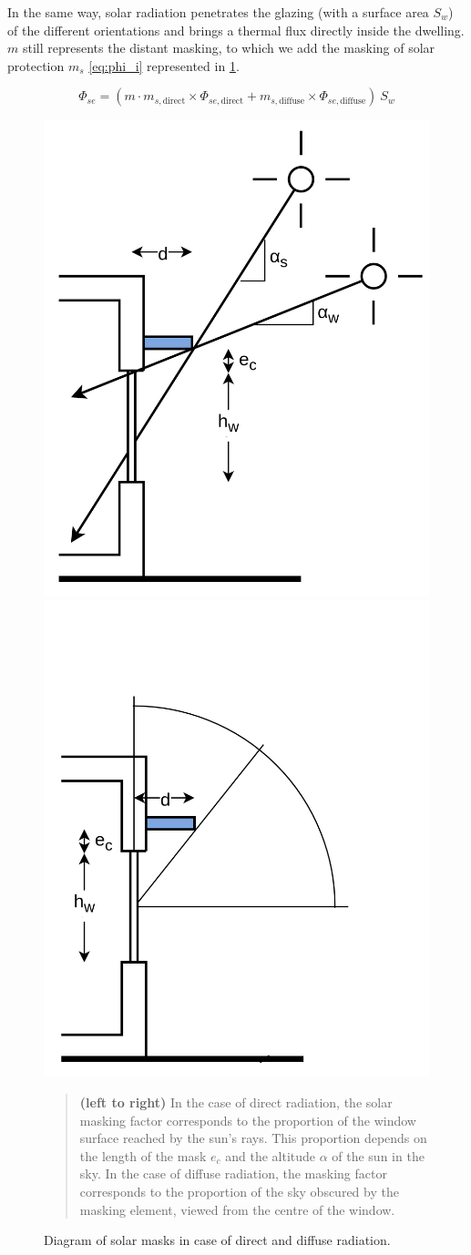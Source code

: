 \documentclass[11pt]{article}
\begin{document}
                In the same way, solar radiation penetrates the glazing (with a surface area $S_w$) of the different orientations and brings a thermal flux directly inside the dwelling. $m$ still represents the distant masking, to which we add the masking of solar protection $m_s$ \eqref{eq:phi_i} represented in \ref{fig:solar_mask_diagram}. 

                \begin{equation}\label{eq:phi_i}
                    \Phi_{se} = \left(m\cdot m_{s,\mathrm{direct}}\times \Phi_{se,\mathrm{direct}} + m_{s,\mathrm{diffuse}}\times\Phi_{se,\mathrm{diffuse}}\right)~ S_w
                \end{equation}

                \begin{figure}[ht]
                \centering
                
                \includegraphics[width=0.32\columnwidth]{figures/solar_mask_direct.png}\hspace{1cm}
                \includegraphics[width=0.32\columnwidth]{figures/solar_mask_diffuse.png}
                
                \caption{\label{fig:solar_mask_diagram} Diagram of solar masks in case of direct and diffuse radiation.}
                    \begin{quote}
                        \vspace{-2mm}
                        \small\noindent
                        \textbf{(left to right)} In the case of direct radiation, the solar masking factor corresponds to the proportion of the window surface reached by the sun's rays. This proportion depends on the length of the mask $e_c$ and the altitude $\alpha$ of the sun in the sky. In the case of diffuse radiation, the masking factor corresponds to the proportion of the sky obscured by the masking element, viewed from the centre of the window. 
                    \end{quote}
                \end{figure}
\end{document}
